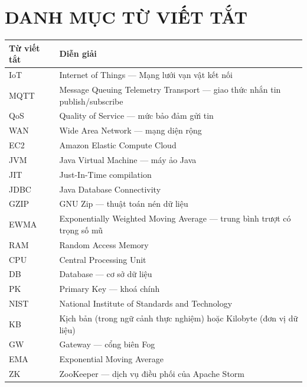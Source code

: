 \documentclass[13pt,a4paper]{report}
\begin{document}
\chapter*{DANH MỤC TỪ VIẾT TẮT}
\thispagestyle{plain}
\renewcommand{\arraystretch}{1.3}
\begin{longtable}{p{} p{}}
\toprule
\textbf{Từ viết tắt} & \textbf{Diễn giải} \\
\midrule
\endhead
IoT      & Internet of Things --- Mạng lưới vạn vật kết nối \\
MQTT     & Message Queuing Telemetry Transport --- giao thức nhắn tin publish/subscribe \\
QoS      & Quality of Service --- mức bảo đảm gửi tin \\
WAN      & Wide Area Network --- mạng diện rộng \\
EC2      & Amazon Elastic Compute Cloud \\
JVM      & Java Virtual Machine --- máy ảo Java \\
JIT      & Just-In-Time compilation \\
JDBC     & Java Database Connectivity \\
GZIP     & GNU Zip --- thuật toán nén dữ liệu \\
EWMA     & Exponentially Weighted Moving Average --- trung bình trượt có trọng số mũ \\
RAM      & Random Access Memory \\
CPU      & Central Processing Unit \\
DB       & Database --- cơ sở dữ liệu \\
PK       & Primary Key --- khoá chính \\
NIST     & National Institute of Standards and Technology \\
KB       & Kịch bản (trong ngữ cảnh thực nghiệm) hoặc Kilobyte (đơn vị dữ liệu) \\
GW       & Gateway --- cổng biên Fog \\
EMA      & Exponential Moving Average \\
ZK       & ZooKeeper --- dịch vụ điều phối của Apache Storm \\
\bottomrule
\end{longtable}
\renewcommand{\arraystretch}{1.0}

\end{document}
